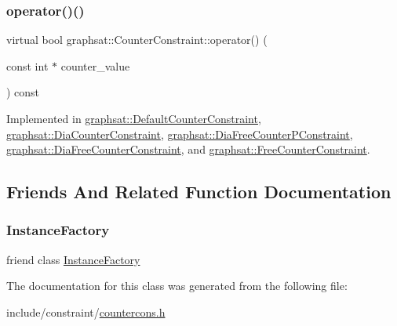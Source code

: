 \subsubsection{\texorpdfstring{operator()()}{operator()()}}
{\footnotesize\ttfamily virtual bool graphsat\+::\+Counter\+Constraint\+::operator() (\begin{DoxyParamCaption}\item[{const int $\ast$}]{counter\+\_\+value }\end{DoxyParamCaption}) const\hspace{0.3cm}{\ttfamily [pure virtual]}}



Implemented in \mbox{\hyperlink{classgraphsat_1_1_default_counter_constraint_a0c7e9fd0402b59afdebfbc1764867aaa}{graphsat\+::\+Default\+Counter\+Constraint}}, \mbox{\hyperlink{classgraphsat_1_1_dia_counter_constraint_a31a8b26714bab4aca765556272dae334}{graphsat\+::\+Dia\+Counter\+Constraint}}, \mbox{\hyperlink{classgraphsat_1_1_dia_free_counter_p_constraint_a02255677df41a98992d4150923d3e169}{graphsat\+::\+Dia\+Free\+Counter\+P\+Constraint}}, \mbox{\hyperlink{classgraphsat_1_1_dia_free_counter_constraint_acb4e5015384b5011ca5347c229b6bb56}{graphsat\+::\+Dia\+Free\+Counter\+Constraint}}, and \mbox{\hyperlink{classgraphsat_1_1_free_counter_constraint_a7ba59c5755c2e90b75038ca6373018bb}{graphsat\+::\+Free\+Counter\+Constraint}}.



\subsection{Friends And Related Function Documentation}
\mbox{\label{classgraphsat_1_1_counter_constraint_ad4b3c25c041701ae56dc1e78df779d2f}} 
\subsubsection{\texorpdfstring{InstanceFactory}{InstanceFactory}}
{\footnotesize\ttfamily friend class \mbox{\hyperlink{classgraphsat_1_1_instance_factory}{Instance\+Factory}}\hspace{0.3cm}{\ttfamily [friend]}}



The documentation for this class was generated from the following file\+:\begin{DoxyCompactItemize}
\item 
include/constraint/\mbox{\hyperlink{countercons_8h}{countercons.\+h}}\end{DoxyCompactItemize}
